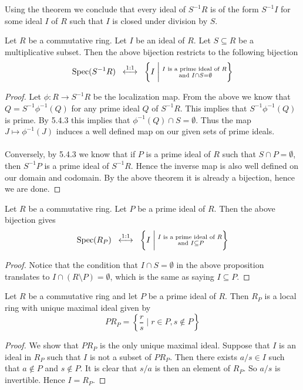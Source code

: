 \documentclass[a4paper]{article}
\begin{document}
Using the theorem we conclude that every ideal of $S^{-1}R$ is of the form $S^{-1}I$ for some ideal $I$ of $R$ such that $I$ is closed under division by $S$. 

\begin{prp}{}{} Let $R$ be a commutative ring. Let $I$ be an ideal of $R$. Let $S\subseteq R$ be a multiplicative subset. Then the above bijection restricts to the following bijection $$\text{Spec}(S^{-1}R)\;\;\overset{1:1}{\longleftrightarrow}\;\;\left\{I\;\bigg{|}\;\substack{I\text{ is a prime ideal of }R\\\text{ and }I\cap S=\emptyset}\right\}$$ 
\begin{proof}
Let $\phi:R\to S^{-1}R$ be the localization map. From the above we know that $Q=S^{-1}\phi^{-1}(Q)$ for any prime ideal $Q$ of $S^{-1}R$. This implies that $S^{-1}\phi^{-1}(Q)$ is prime. By 5.4.3 this implies that $\phi^{-1}(Q)\cap S=\emptyset$. Thus the map $J\mapsto\phi^{-1}(J)$ induces a well defined map on our given sets of prime ideals. \\~\\

Conversely, by 5.4.3 we know that if $P$ is a prime ideal of $R$ such that $S\cap P=\emptyset$, then $S^{-1}P$ is a prime ideal of $S^{-1}R$. Hence the inverse map is also well defined on our domain and codomain. By the above theorem it is already a bijection, hence we are done. 
\end{proof}
\end{prp}

\begin{prp}{}{} Let $R$ be a commutative ring. Let $P$ be a prime ideal of $R$. Then the above bijection gives $$\text{Spec}(R_P)\;\;\overset{1:1}{\longleftrightarrow}\;\;\left\{I\;\bigg{|}\;\substack{I\text{ is a prime ideal of }R\\\text{ and }I\subseteq P}\right\}$$ 
\begin{proof}
Notice that the condition that $I\cap S=\emptyset$ in the above proposition translates to $I\cap (R\setminus P)=\emptyset$, which is the same as saying $I\subseteq P$. 
\end{proof}
\end{prp}

\begin{prp}{}{} Let $R$ be a commutative ring and let $P$ be a prime ideal of $R$. Then $R_P$ is a local ring with unique maximal ideal given by $$PR_P=\left\{\frac{r}{s}\;|\;r\in P,s\notin P\right\}$$ 
\begin{proof}
We show that $PR_P$ is the only unique maximal ideal. Suppose that $I$ is an ideal in $R_P$ such that $I$ is not a subset of $PR_P$. Then there exists $a/s\in I$ such that $a\notin P$ and $s\notin P$. It is clear that $s/a$ is then an element of $R_P$. So $a/s$ is invertible. Hence $I=R_P$. 
\end{proof}
\end{prp}
\end{document}
